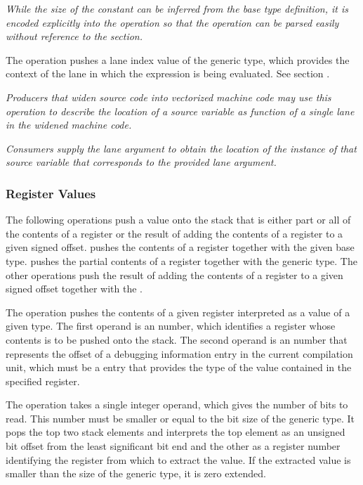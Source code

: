 \begin{enumerate}[1. ]
\textit{While the size of the constant can be inferred from the base type
definition, it is encoded explicitly into the operation so that the
operation can be parsed easily without reference to the \dotdebuginfo{}
section.}

\itembfnl{\DWOPpushlaneTARG}
The \DWOPpushlaneNAME{} operation pushes a lane index value
of the generic type, which provides the context of the lane in
which the expression is being evaluated.
See section .

\textit{Producers that widen source code into vectorized machine
code may use this operation to describe the location of a source
variable as function of a single lane in the widened machine code.}

\textit{Consumers supply the lane argument to obtain the
location of the instance of that source variable that corresponds
to the provided lane argument.}

\end{enumerate}

\subsubsection{Register Values}
\label{chap:registervalues}
The following operations push a value onto the stack that is either
\bb
part or all of
\eb
the contents of a register or the result of adding the contents of a
register to a given signed offset.
\DWOPregvaltype{} pushes the contents of
\bb
a
\eb
register together with the given base type.
\bb
\DWOPregvalbits{} pushes the partial contents of
a register together with the generic type.
\eb
The other operations
push the result of adding the contents of a register to a given
signed offset together with the \generictype.

\begin{enumerate}[1. ]

\itembfnl{\DWOPregvaltypeTARG}
The \DWOPregvaltypeNAME{} operation
\bb
pushes
\eb
the contents of
a given register interpreted as a value of a given type. The first
operand is an \ULEB{} number,
which identifies a register whose contents is to
be pushed onto the stack. The second operand is an \ULEB{} number
that represents the offset of a debugging information entry in the current
compilation unit, which must be a \DWTAGbasetype{} entry that provides the
type of the value contained in the specified register.

\bb
\itembfnl{\DWOPregvalbitsTARG}
The \DWOPregvalbitsNAME{} operation takes a single \ULEB{}
integer operand, which gives the number of bits to read. This number must
be smaller or equal to the bit size of the generic type.  It pops
the top two stack elements and interprets the top element as an
unsigned bit offset from the least significant bit end and the
other as a register number identifying the register from which to
extract the value.  If the extracted value is smaller than the size
of the generic type, it is zero extended.
\eb

\end{enumerate}

